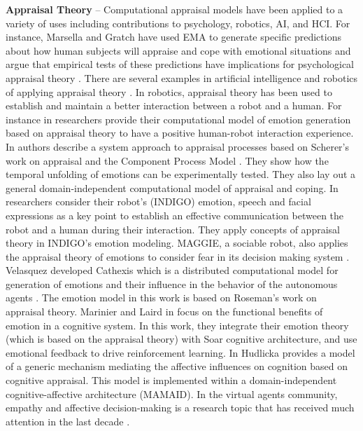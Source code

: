\textbf{Appraisal Theory} -- Computational appraisal models have been applied to
a variety of uses including contributions to psychology, robotics, AI, and HCI.
For instance, Marsella and Gratch have used EMA
\cite{marsella:ema-process-model} to generate specific predictions about how
human subjects will appraise and cope with emotional situations and argue that
empirical tests of these predictions have implications for psychological
appraisal theory \cite{gratch:assessing-appraisal}. There are several examples
in artificial intelligence and robotics of applying appraisal theory
\cite{adam:bdi-emotional-companion} \cite{kim:model-hri-appraisal}
\cite{marsella:ema-process-model}. In robotics, appraisal theory has been used
to establish and maintain a better interaction between a robot and a human. For
instance in \cite{kim:model-hri-appraisal} researchers provide their
computational model of emotion generation based on appraisal theory to have a
positive human-robot interaction experience. In
\cite{sander:systems-approach-appraisal} authors describe a system approach to
appraisal processes based on Scherer's work on appraisal and the Component
Process Model \cite{scherer:nature-function-emotion}. They show how the temporal
unfolding of emotions can be experimentally tested. They also lay out a general
domain-independent computational model of appraisal and coping. In
\cite{vogiatzis:robot-museum} researchers consider their robot's (INDIGO)
emotion, speech and facial expressions as a key point to establish an effective
communication between the robot and a human during their interaction. They apply
concepts of appraisal theory in INDIGO's emotion modeling. MAGGIE, a sociable
robot, also applies the appraisal theory of emotions to consider fear in its
decision making system \cite{castro:autonomous-robot-fear}. Velasquez developed
Cathexis which is a distributed computational model for generation of emotions
and their influence in the behavior of the autonomous agents
\cite{velasquez:emotions-motivations-agents}. The emotion model in this work is
based on Roseman's work on appraisal theory. Marinier and Laird in
\cite{marinier:emotion-reinforcement} focus on the functional benefits of
emotion in a cognitive system. In this work, they integrate their emotion theory
(which is based on the appraisal theory) with Soar cognitive architecture, and
use emotional feedback to drive reinforcement learning. In
\cite{hudlicka:emotinos-reasons} Hudlicka provides a model of a generic
mechanism mediating the affective influences on cognition based on cognitive
appraisal. This model is implemented within a domain-independent
cognitive-affective architecture (MAMAID). In the virtual agents community,
empathy and affective decision-making is a research topic that has received much
attention in the last decade \cite{scott:modeling-empathy-agent}
\cite{paiva:agent-care} \cite{pontier:women-robot-men}.

